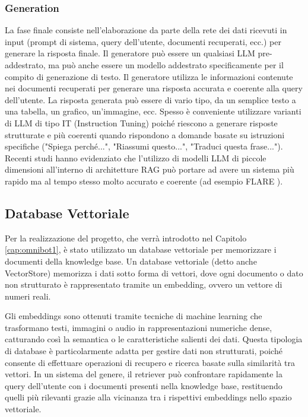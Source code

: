 \subsubsection{Generation}
La fase finale consiste nell'elaborazione da parte della rete dei dati ricevuti in input (prompt di sistema, query dell'utente, documenti recuperati, ecc.) per generare la risposta finale. Il generatore può essere un qualsiasi LLM pre-addestrato, ma può anche essere un modello addestrato specificamente per il compito di generazione di testo. Il generatore utilizza le informazioni contenute nei documenti recuperati per generare una risposta accurata e coerente alla query dell'utente. La risposta generata può essere di vario tipo, da un semplice testo a una tabella, un grafico, un'immagine, ecc. Spesso è conveniente utilizzare varianti di LLM di tipo IT (Instruction Tuning) \cite{zhang2024instructiontuninglargelanguage,ouyang2022traininglanguagemodelsfollow} poiché riescono a generare risposte strutturate e più coerenti quando rispondono a domande basate su istruzioni specifiche ("Spiega perché...", "Riassumi questo...", "Traduci questa frase...").
Recenti studi hanno evidenziato che l'utilizzo di modelli LLM di piccole dimensioni \cite{hsieh2023distillingstepbystepoutperforminglarger,mukherjee2023orcaprogressivelearningcomplex} all'interno di architetture RAG può portare ad avere un sistema più rapido ma al tempo stesso molto accurato e coerente (ad esempio FLARE \cite{jiang2023activeretrievalaugmentedgeneration}).

\subsection{Database Vettoriale}
\label{subsec:database_vettoriale}
Per la realizzazione del progetto, che verrà introdotto nel Capitolo \ref{cap:omnibot1}, è stato utilizzato un database vettoriale per memorizzare i documenti della knowledge base. Un database vettoriale (detto anche VectorStore) memorizza i dati sotto forma di vettori, dove ogni documento o dato non strutturato è rappresentato tramite un embedding, ovvero un vettore di numeri reali.

Gli embeddings sono ottenuti tramite tecniche di machine learning che trasformano testi, immagini o audio in rappresentazioni numeriche dense, catturando così la semantica o le caratteristiche salienti dei dati.
Questa tipologia di database è particolarmente adatta per gestire dati non strutturati, poiché consente di effettuare operazioni di recupero e ricerca basate sulla similarità tra vettori. In un sistema del genere, il retriever può confrontare rapidamente la query dell'utente con i documenti presenti nella knowledge base, restituendo quelli più rilevanti grazie alla vicinanza tra i rispettivi embeddings nello spazio vettoriale.

